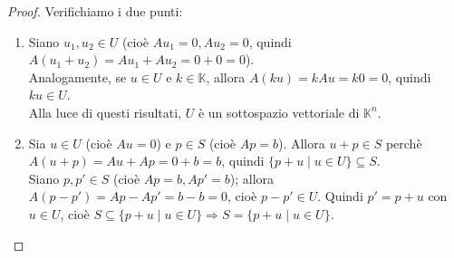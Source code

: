 \documentclass[a4paper]{article}
\theoremstyle{definition}
\begin{document}
	\begin{proof}
		Verifichiamo i due punti:
		\begin{enumerate}
			\item Siano $u_1, u_2 \in U$ (cioè $Au_1 = 0, Au_2 = 0$, quindi $A(u_1 + u_2) = Au_1 + Au_2 = 0 + 0 = 0$). \\
			Analogamente, se $u \in U$ e $k \in \mathbb{K}$, allora $A(ku) = kAu = k0 = 0$, quindi $ku \in U$. \\
			Alla luce di questi risultati, $U$ è un sottospazio vettoriale di $\mathbb{K}^n$.
			\item Sia $u \in U$ (cioè $Au = 0$) e $p \in S$ (cioè $Ap = b$). Allora $u + p \in S$ perchè $A(u + p) = Au + Ap = 0 + b = b$,
			quindi $\{p + u \mid u \in U\} \subseteq S$. \\
			Siano $p, p' \in S$ (cioè $Ap = b, Ap' = b$); allora $A(p - p') = Ap - Ap' = b - b = 0$, cioè $p - p' \in U$.
			Quindi $p' = p + u$ con $u \in U$, cioè $S \subseteq \{p + u \mid u \in U\} \Rightarrow S = \{p + u \mid u \in U\}$.
		\end{enumerate}
	\end{proof}
	
\end{document}
